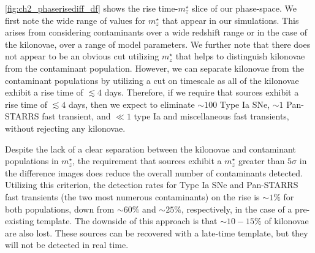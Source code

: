 \autoref{fig:ch2_phaserisediff_df} shows the rise time-$m^{\star}_z$ slice of our phase-space. We first note the wide range of values for $m^{\star}_z$ that appear in our simulations. This arises from considering contaminants over a wide redshift range or in the case of the kilonovae, over a range of model parameters. We further note that there does not appear to be an obvious cut utilizing $m^{\star}_z$ that helps to distinguish kilonovae from the contaminant population. However, we can separate kilonovae from the contaminant populations by utilizing a cut on timescale as all of the kilonovae exhibit a rise time of $\lesssim 4$ days. Therefore, if we require that sources exhibit a rise time of $\lesssim 4$ days, then we expect to eliminate $\sim 100$ Type Ia SNe, $\sim 1$ Pan-STARRS fast transient, and $\ll1$ type Ia and miscellaneous fast transients, without rejecting any kilonovae.

Despite the lack of a clear separation between the kilonovae and contaminant populations in $m^{\star}_z$, the requirement that sources exhibit a $m^{\star}_z$ greater than $5\sigma$ in the difference images does reduce the overall number of contaminants detected. Utilizing this criterion, the detection rates for Type Ia SNe and Pan-STARRS fast transients (the two most numerous contaminants) on the rise is $\sim1\%$ for both populations, down from $\sim60\%$ and $\sim25\%$, respectively, in the case of a pre-existing template. The downside of this approach is that $\sim10-15\%$ of kilonovae are also lost. These sources can be recovered with a late-time template, but they will not be detected in real time.

